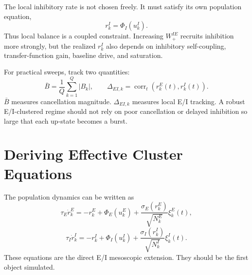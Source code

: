 The local inhibitory rate is not chosen freely. It must satisfy its own population equation,
%
\begin{equation}
  r_k^I
  =
  \Phi_I(u_k^I).
  \label{eq:inhibitory-self-consistency}
\end{equation}
%
Thus local balance is a coupled constraint. Increasing $W_{+}^{IE}$ recruits inhibition more strongly, but the realized $r_k^I$ also depends on inhibitory self-coupling, transfer-function gain, baseline drive, and saturation.

For practical sweeps, track two quantities:
%
\begin{equation}
  \bar B
  =
  \frac{1}{Q}\sum_{k=1}^{Q}|B_k|,
  \qquad
  \Delta_{EI,k}
  =
  \operatorname{corr}_{t}\!\left(r_k^E(t),r_k^I(t)\right).
  \label{eq:balance-and-tracking-diagnostics}
\end{equation}
%
$\bar B$ measures cancellation magnitude. $\Delta_{EI,k}$ measures local E/I tracking. A robust E/I-clustered regime should not rely on poor cancellation or delayed inhibition so large that each up-state becomes a burst.

\section{Deriving Effective Cluster Equations}
\label{sec:deriving-effective-cluster-equations}

The population dynamics can be written as
%
\begin{equation}
  \tau_E \dot r_k^E
  =
  -r_k^E+\Phi_E(u_k^E)
  +
  \frac{\sigma_E(r_k^E)}{\sqrt{N_k^E}}\xi_k^E(t),
  \label{eq:ei-meso-e-dynamics}
\end{equation}
%
\begin{equation}
  \tau_I \dot r_k^I
  =
  -r_k^I+\Phi_I(u_k^I)
  +
  \frac{\sigma_I(r_k^I)}{\sqrt{N_k^I}}\xi_k^I(t).
  \label{eq:ei-meso-i-dynamics}
\end{equation}
%
These equations are the direct E/I mesoscopic extension. They should be the first object simulated.

